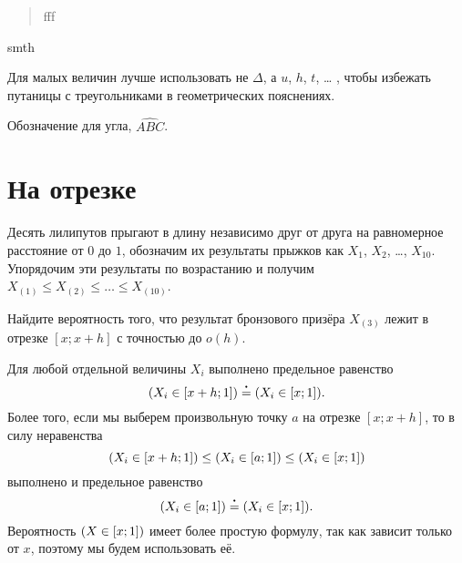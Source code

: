 \documentclass[12pt]{article}
\let\P\relax
\DeclareMathOperator{\P}{\mathbb{P}}
\newcommand\vardot[1][.4]{\mathbin{\vcenter{\hbox{\scalebox{#1}{$\bullet$}}}}}
\newcommand{\ulteq}{\mathrel{\overset{\vardot}{=}}}
\newcommand{\angl}[1]{\widehat{#1}}
\begin{document}
\begin{verse}
    \begin{flushright}
fff
    \end{flushright}
\end{verse}


\begin{tcolorbox}[colback=yellow!50!red!25!white]
smth
\end{tcolorbox}

Для малых величин лучше использовать не $\Delta$, а $u$, $h$, $t$, \ldots{ }, чтобы избежать путаницы с треугольниками в геометрических пояснениях.

Обозначение для угла, $\angl{ABC}$.

\section*{На отрезке}

Десять лилипутов прыгают в длину независимо друг от друга на равномерное расстояние от $0$ до $1$,
обозначим их результаты прыжков как $X_1$, $X_2$, \dots, $X_{10}$.
Упорядочим эти результаты по возрастанию и получим $X_{(1)} \leq X_{(2)} \leq \dots \leq X_{(10)}$.

Найдите вероятность того, что результат бронзового призёра $X_{(3)}$ лежит в отрезке $[x; x+h]$ с точностью до $o(h)$.



Для любой отдельной величины $X_i$ выполнено предельное равенство
\[
\P(X_i \in [x+h; 1]) \ulteq \P(X_i \in [x; 1]).
\]
Более того, если мы выберем произвольную точку $a$ на отрезке $[x; x+h]$, то в силу неравенства
\[
\P(X_i \in [x+h; 1]) \leq \P(X_i \in [a; 1]) \leq \P(X_i \in [x; 1])
\]
выполнено и предельное равенство
\[
\P(X_i \in [a; 1]) \ulteq \P(X_i \in [x; 1]).
\]
Вероятность $\P(X \in [x; 1])$ имеет более простую формулу, так как зависит только от $x$, поэтому мы будем использовать её.
\end{document}

